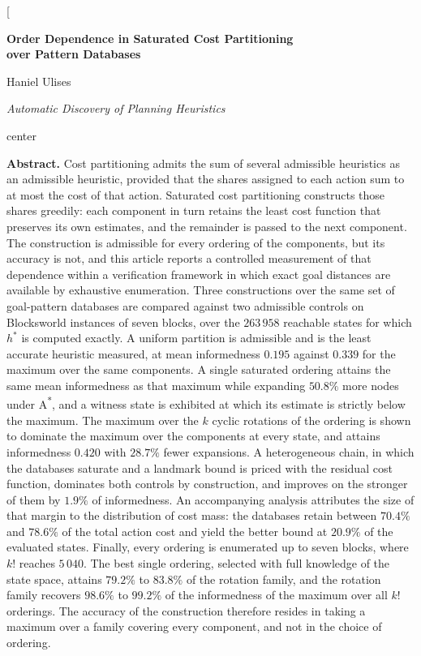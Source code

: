 \documentclass[10pt,twocolumn,a4paper]{article}
\theoremstyle{plain}
\theoremstyle{definition}
\theoremstyle{remark}
\newcommand{\hstar}{h^{*}}
\begin{document}
\twocolumn[
\begin{@twocolumnfalse}
\begin{center}
{\LARGE\bfseries Order Dependence in Saturated Cost Partitioning\\[2pt] over Pattern Databases\par}
\vspace{0.9em}
{\large Haniel Ulises\par}
\vspace{0.35em}
{\itshape Automatic Discovery of Planning Heuristics\par}
\vspace{1.3em}
\end{center}

\begin{adjustbox}{center}
\begin{minipage}{0.86\textwidth}
\noindent\textbf{Abstract.}
Cost partitioning admits the sum of several admissible heuristics as an
admissible heuristic, provided that the shares assigned to each action sum to
at most the cost of that action. Saturated cost partitioning constructs those
shares greedily: each component in turn retains the least cost function that
preserves its own estimates, and the remainder is passed to the next component.
The construction is admissible for every ordering of the components, but its
accuracy is not, and this article reports a controlled measurement of that
dependence within a verification framework in which exact goal distances are
available by exhaustive enumeration. Three constructions over the same set of
goal-pattern databases are compared against two admissible controls on
Blocksworld instances of seven blocks, over the $263\,958$ reachable states for
which $\hstar$ is computed exactly. A uniform partition is admissible and is
the least accurate heuristic measured, at mean informedness $0.195$ against
$0.339$ for the maximum over the same components. A single saturated ordering
attains the same mean informedness as that maximum while expanding
$50.8\%$ more nodes under A\textsuperscript{*}, and a witness state is
exhibited at which its estimate is strictly below the maximum. The maximum over
the $k$ cyclic rotations of the ordering is shown to dominate the maximum over
the components at every state, and attains informedness $0.420$ with $28.7\%$
fewer expansions. A heterogeneous chain, in which the databases saturate and a
landmark bound is priced with the residual cost function, dominates both
controls by construction, and improves on the stronger of them by $1.9\%$ of
informedness. An accompanying analysis attributes the size of that margin to
the distribution of cost mass: the databases retain between $70.4\%$ and
$78.6\%$ of the total action cost and yield the better bound at $20.9\%$ of the
evaluated states. Finally, every ordering is enumerated up to seven
blocks, where $k!$ reaches $5\,040$. The best single ordering, selected with
full knowledge of the state space, attains $79.2\%$ to $83.8\%$ of the rotation
family, and the rotation family recovers $98.6\%$ to $99.2\%$ of the
informedness of the maximum over all $k!$ orderings. The accuracy of the
construction therefore resides in taking a maximum over a family covering every
component, and not in the choice of ordering.


\end{minipage}
\end{adjustbox}
\end{@twocolumnfalse}
\end{document}
